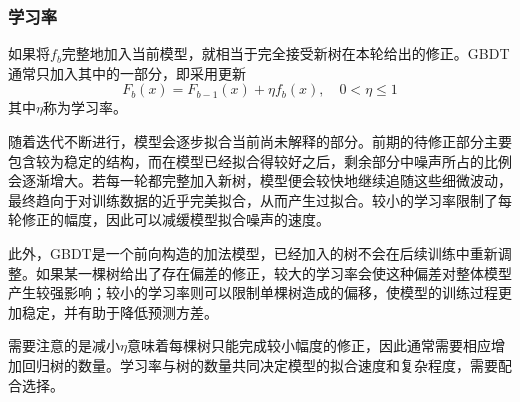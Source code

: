 \subsubsection{学习率}
如果将$f_b$完整地加入当前模型，就相当于完全接受新树在本轮给出的修正。GBDT通常只加入其中的一部分，即采用更新
\begin{equation*}
	F_b(x)=F_{b-1}(x)+\eta f_b(x),\quad0<\eta\leqslant1
\end{equation*}
其中$\eta$称为学习率。\par
随着迭代不断进行，模型会逐步拟合当前尚未解释的部分。前期的待修正部分主要包含较为稳定的结构，而在模型已经拟合得较好之后，剩余部分中噪声所占的比例会逐渐增大。若每一轮都完整加入新树，模型便会较快地继续追随这些细微波动，最终趋向于对训练数据的近乎完美拟合，从而产生过拟合。较小的学习率限制了每轮修正的幅度，因此可以减缓模型拟合噪声的速度。\par
此外，GBDT是一个前向构造的加法模型，已经加入的树不会在后续训练中重新调整。如果某一棵树给出了存在偏差的修正，较大的学习率会使这种偏差对整体模型产生较强影响；较小的学习率则可以限制单棵树造成的偏移，使模型的训练过程更加稳定，并有助于降低预测方差。\par
需要注意的是减小$\eta$意味着每棵树只能完成较小幅度的修正，因此通常需要相应增加回归树的数量。学习率与树的数量共同决定模型的拟合速度和复杂程度，需要配合选择。
